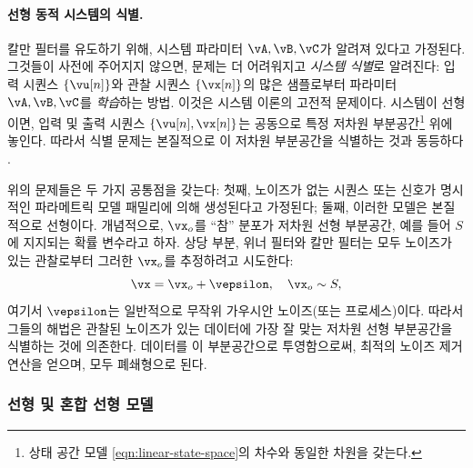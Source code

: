 \documentclass[../../book-main_ko.tex]{subfiles}
\begin{document}
\paragraph{선형 동적 시스템의 식별.}
칼만 필터를 유도하기 위해, 시스템 파라미터 \(\vA, \vB, \vC\)가 알려져 있다고 가정된다. 그것들이 사전에 주어지지 않으면, 문제는 더 어려워지고 \textit{시스템 식별}로 알려진다: 입력 시퀀스 \(\{\vu[n]\}\)와 관찰 시퀀스 \(\{\vx[n]\}\)의 많은 샘플로부터 파라미터 \(\vA, \vB, \vC\)를 \textit{학습}하는 방법. 이것은 시스템 이론의 고전적 문제이다. 시스템이 선형이면, 입력 및 출력 시퀀스 \(\{\vu[n], \vx[n]\}\)는 공동으로 특정 저차원 부분공간\footnote{상태 공간 모델 \eqref{eqn:linear-state-space}의 차수와 동일한 차원을 갖는다.} 위에 놓인다. 따라서 식별 문제는 본질적으로 이 저차원 부분공간을 식별하는 것과 동등하다 \cite{OverscheeP1996,Liu-2009-CDC,Liu-2010-SIAM}.

위의 문제들은 두 가지 공통점을 갖는다: 첫째, 노이즈가 없는 시퀀스 또는 신호가 명시적인 파라메트릭 모델 패밀리에 의해 생성된다고 가정된다; 둘째, 이러한 모델은 본질적으로 선형이다. 개념적으로, \(\vx_{o}\)를 ``참'' 분포가 저차원 선형 부분공간, 예를 들어 \(S\)에 지지되는 확률 변수라고 하자. 상당 부분, 위너 필터와 칼만 필터는 모두 노이즈가 있는 관찰로부터 그러한 \(\vx_{o}\)를 추정하려고 시도한다:
\begin{equation}
    \vx = \vx_{o} + \vepsilon, \quad \vx_{o} \sim S,
\end{equation}
여기서 \(\vepsilon\)는 일반적으로 무작위 가우시안 노이즈(또는 프로세스)이다. 따라서 그들의 해법은 관찰된 노이즈가 있는 데이터에 가장 잘 맞는 저차원 선형 부분공간을 식별하는 것에 의존한다. 데이터를 이 부분공간으로 투영함으로써, 최적의 노이즈 제거 연산을 얻으며, 모두 폐쇄형으로 된다.


\subsubsection{선형 및 혼합 선형 모델}
\label{sec:PCA-ICA}
\end{document}
